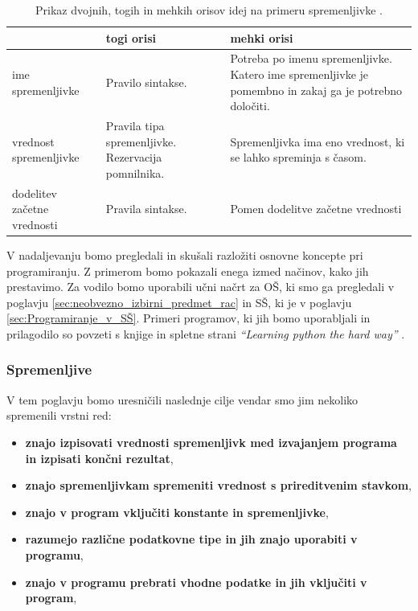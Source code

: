 \begin{table}[!h]

\caption{Prikaz dvojnih, togih in mehkih orisov idej na primeru
  spremenljivke \cite{guideTCS}. }
\label{tab:koncept_spremenljivka}
\begin{tabular}{
  | p{} |
  p{} |
  p{} | }
  \hline
  \rowcolor{sbase01!100}
  & \textbf{togi orisi} & \textbf{mehki orisi}\\
  \hline
  ime spremenljivke & Pravilo sintakse. & Potreba po imenu
                                          spremenljivke. Katero ime
                                          spremenljivke je pomembno in
                                          zakaj ga je potrebno
                                          določiti.\\
  \hline
  vrednost spremenljivke & Pravila tipa spremenljivke. Rezervacija
                           pomnilnika. & Spremenljivka ima eno
                                         vrednost, ki se lahko
                                         spreminja s časom.\\
  \hline
  dodelitev začetne vrednosti & Pravila sintakse. & Pomen dodelitve
                                                  začetne vrednosti\\
  \hline

\end{tabular}
\end{table}

V nadaljevanju bomo pregledali in skušali razložiti osnovne koncepte
pri programiranju. Z primerom bomo pokazali enega izmed načinov, kako
jih prestavimo. Za vodilo bomo uporabili učni načrt za OŠ, ki smo ga
pregledali v poglavju \ref{sec:neobvezno_izbirni_predmet_rac} in SŠ,
ki je v poglavju \ref{sec:Programiranje_v_SŠ}. Primeri programov, ki
jih bomo uporabljali in prilagodilo so povzeti s knjige in spletne
strani \emph{``Learning python the hard way''} \cite{web:PTHardWay}.



\subsubsection{Spremenljive}
\label{sec:spremenljivke}

V tem poglavju bomo uresničili naslednje cilje vendar smo jim nekoliko
spremenili vrstni red:
\begin{itemize}
\tightlist
\item \textbf{znajo izpisovati vrednosti spremenljivk med izvajanjem programa
  in izpisati končni rezultat},
\item \textbf{znajo spremenljivkam spremeniti vrednost s prireditvenim
  stavkom},
\item \textbf{znajo v program vključiti konstante in spremenljivke},
\item \textbf{ razumejo različne podatkovne tipe in jih znajo uporabiti v
  programu},
\item \textbf{znajo v programu prebrati vhodne podatke in jih vključiti v
  program},
\end{itemize}

